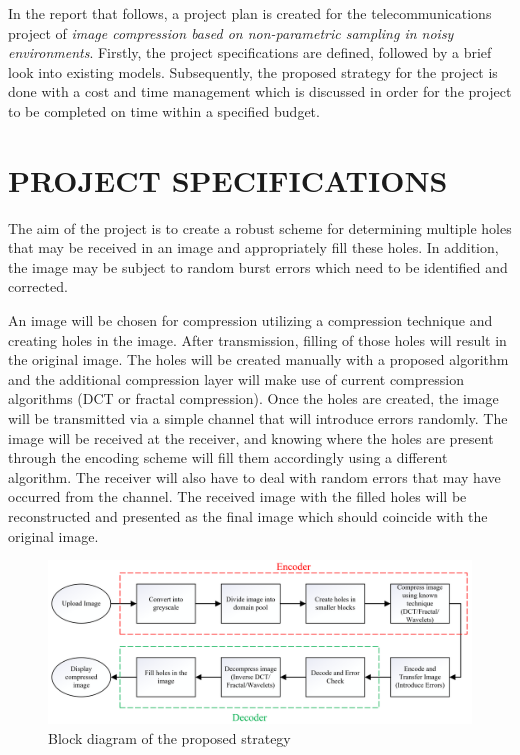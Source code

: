 \documentclass[10pt,twocolumn, a4paper]{witseiepaper}
\begin{document}
In the report that follows, a project plan is created for the telecommunications project of \emph{image compression based on non-parametric sampling in noisy environments}. Firstly, the project specifications are defined, followed by a brief look into existing models. Subsequently, the proposed strategy for the project is done with a cost and time management which is discussed in order for the project to be completed on time within a specified budget.

%
\section{PROJECT SPECIFICATIONS}
\label{sec: Project Specs}
The aim of the project is to create a robust scheme for determining multiple holes that may be received in an image and appropriately fill these holes. In addition, the image may be subject to random burst errors which need to be identified and corrected.

An image will be chosen for compression utilizing a compression technique and creating holes in the image. After transmission, filling of those holes will result in the original image. The holes will be created manually with a proposed algorithm and the additional compression layer will make use of current compression algorithms (DCT or fractal compression). Once the holes are created, the image will be transmitted via a simple channel that will introduce errors randomly. The image will be received at the receiver, and knowing where the holes are present through the encoding scheme will fill them accordingly using a different algorithm. The receiver will also have to deal with random errors that may have occurred from the channel. The received image with the filled holes will be reconstructed and presented as the final image which should coincide with the original image.

%
\begin{figure}[t!]
\renewcommand{\thefigure}{\arabic{figure}}
\hspace{-0.5cm}
\includegraphics[scale=0.35]{BlockDiagram.png}
\caption{Block diagram of the proposed strategy}
\label{fig: Block Diagram}
\end{figure}
\end{document}
